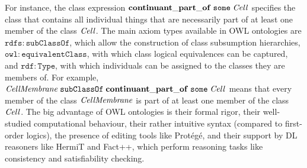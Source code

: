 
For instance, the class expression $\mathrm{\mathbf{continuant\_part\_of}}\;\mathtt{some}\;\mathit{Cell}$ specifies the class that contains all individual things
that are necessarily part of at least one member of the class $\mathit{Cell}$.
The main axiom types available in OWL ontologies are $\mathtt{rdfs:subClassOf}$, which allow the construction of class subsumption hierarchies,
$\mathtt{owl:equivalentClass}$, with which class logical equivalences can be captured, and $\mathtt{rdf:Type}$, with which individuals can be assigned to the classes they are members of.
For example, $\mathit{CellMembrane}\;\mathtt{subClassOf}\;\mathrm{\mathbf{continuant\_part\_of}}\;\mathtt{some}\;\mathit{Cell}$
means that every member of the class $\mathit{CellMembrane}$ is
part of at least one member of the class $\mathit{Cell}$.
The big advantage of OWL ontologies is their formal rigor,
their well-studied computational behaviour, their rather
intuitive syntax (compared to first-order logics), the presence of editing tools like Prot\'eg\'e,
and their support by DL reasoners like HermiT and Fact++, which perform
reasoning tasks like consistency and satisfiability checking.
